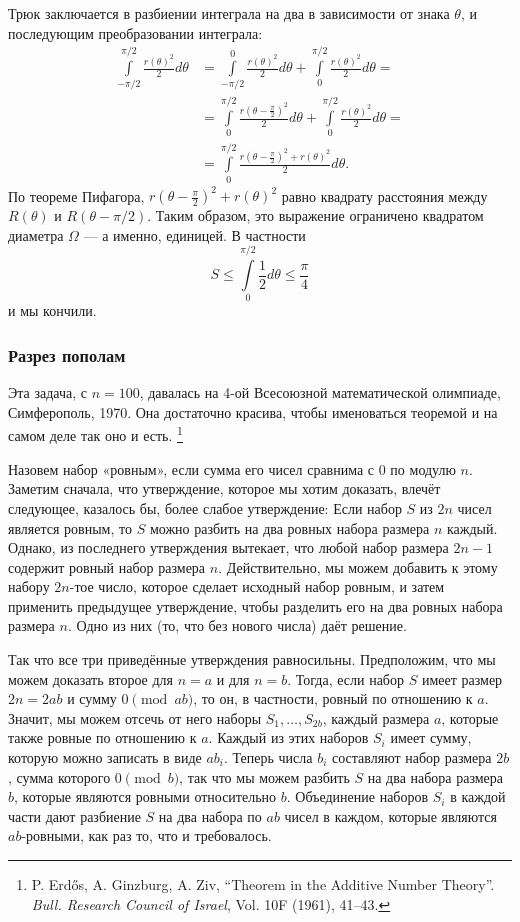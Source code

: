 Трюк заключается в разбиении интеграла на два в зависимости от знака $\theta$, и последующим преобразовании интеграла:
\begin{align*}
\int\limits_{-\pi/2}^{\pi/2}\frac{r(\theta)^2}{2}d\theta&=\int\limits_{-\pi/2}^{0}\frac{r(\theta)^2}{2}d\theta+\int\limits_{0}^{\pi/2}\frac{r(\theta)^2}{2}d\theta=
\\
&=\int\limits_{0}^{\pi/2}\frac{r(\theta-\tfrac\pi2)^2}{2}d\theta+\int\limits_{0}^{\pi/2}\frac{r(\theta)^2}{2}d\theta=
\\
&=\int\limits_{0}^{\pi/2}\frac{r(\theta-\tfrac\pi2)^2+r(\theta)^2}{2}d\theta.
\end{align*}
По теореме Пифагора, $r(\theta-\tfrac\pi2)^2+r(\theta)^2$ равно квадрату расстояния между $R(\theta)$ и $R(\theta- \pi/2)$.
Таким образом, это выражение ограничено квадратом диаметра $\Omega$ --- а именно, единицей.
В частности
\[S\le \int\limits_{0}^{\pi/2}\frac12d\theta\le\frac\pi4\]
и мы кончили.
\heart

\subsubsection*{Разрез пополам}

Эта задача, с $n=100$, давалась на 4-ой Всесоюзной математической олимпиаде, Симферополь, 1970.
Она достаточно красива, чтобы именоваться теоремой и на самом деле так оно и есть.%
\footnote{P. Erd\H{o}s, A. Ginzburg, A. Ziv, ``Theorem in the Additive Number Theory''. \emph{Bull. Research Council of Israel}, Vol. 10F (1961), 41--43.}

\medskip

Назовем набор «ровным», если сумма его чисел сравнима с $0$ по модулю $n$.
Заметим сначала, что утверждение, которое мы хотим доказать, влечёт следующее, казалось бы, более слабое утверждение: 
Если набор $S$ из $2n$ чисел является ровным, то $S$ можно разбить на два ровных набора размера $n$ каждый.
Однако, из последнего утверждения вытекает, что любой набор размера $2n-1$ содержит ровный набор размера $n$.
Действительно, мы можем добавить к этому набору $2n$-тое число, которое сделает исходный набор ровным, и затем применить предыдущее утверждение, чтобы разделить его на два ровных набора размера $n$. 
Одно из них (то, что без нового числа) даёт решение.

Так что все три приведённые утверждения равносильны.
Предположим, что мы можем доказать второе для $n = a$ и для $n = b$.
Тогда, если набор $S$ имеет размер $2n = 2ab$ и сумму $0 \pmod {ab}$, то он, в частности, ровный по отношению к $a$. 
Значит, мы можем отсечь от него наборы $S_1,\dots,S_{2b}$, каждый размера $a$, которые также ровные по отношению к $a$.
Каждый из этих наборов $S_i$ имеет сумму, которую можно записать в виде $ab_i$.
Теперь числа $b_i$ составляют набор размера $2b$, сумма которого $0 \pmod b$, так что мы можем разбить $S$ на два набора размера $b$, которые являются ровными относительно $b$.
Объединение наборов $S_i$ в каждой части дают разбиение $S$ на два набора по $ab$ чисел в каждом, которые являются $ab$-ровными, как раз то, что и требовалось.

